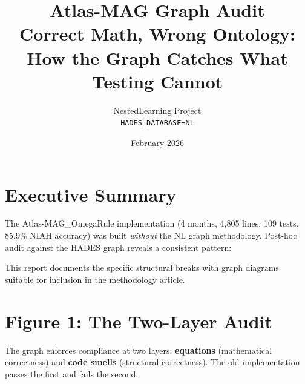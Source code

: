 \documentclass[11pt,letterpaper]{article}
\title{%
  \textbf{Atlas-MAG Graph Audit}\\[0.3em]
  \large Correct Math, Wrong Ontology:\\
  How the Graph Catches What Testing Cannot%
}
\author{%
  NestedLearning Project\\
  \texttt{HADES\_DATABASE=NL}%
}
\date{February 2026}
\begin{document}
\maketitle
\thispagestyle{fancy}

\section{Executive Summary}

The Atlas-MAG\_OmegaRule implementation (4 months, 4{,}805 lines, 109 tests,
85.9\% NIAH accuracy) was built \emph{without} the NL graph methodology.
Post-hoc audit against the HADES graph reveals a consistent pattern:

\begin{center}
\end{center}

This report documents the specific structural breaks with graph diagrams
suitable for inclusion in the methodology article.

\section{Figure 1: The Two-Layer Audit}

The graph enforces compliance at two layers: \textbf{equations} (mathematical
correctness) and \textbf{code smells} (structural correctness). The old
implementation passes the first and fails the second.
\end{document}
